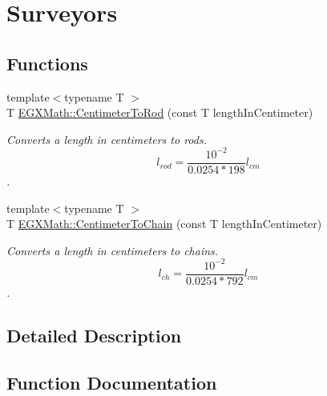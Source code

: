 \hypertarget{group___e_g_x_math-_conversions-_length_conversions-_s_i-_centimeter-_surveyors}{}\section{Surveyors}
\label{group___e_g_x_math-_conversions-_length_conversions-_s_i-_centimeter-_surveyors}
\subsection*{Functions}
\begin{DoxyCompactItemize}
\item 
{\footnotesize template$<$typename T $>$ }\\T \mbox{\hyperlink{group___e_g_x_math-_conversions-_length_conversions-_s_i-_centimeter-_surveyors_gae8148fd547fed6b4308b4ba4b54c2273}{E\+G\+X\+Math\+::\+Centimeter\+To\+Rod}} (const T length\+In\+Centimeter)
\begin{DoxyCompactList}\small\item\em Converts a length in centimeters to rods. \[ l_{rod}= \frac{10^{-2}}{0.0254 * 198} l_{cm} \]. \end{DoxyCompactList}\item 
{\footnotesize template$<$typename T $>$ }\\T \mbox{\hyperlink{group___e_g_x_math-_conversions-_length_conversions-_s_i-_centimeter-_surveyors_gaec0a2935a1378c75c03f93d48794374a}{E\+G\+X\+Math\+::\+Centimeter\+To\+Chain}} (const T length\+In\+Centimeter)
\begin{DoxyCompactList}\small\item\em Converts a length in centimeters to chains. \[ l_{ch}= \frac{10^{-2}}{0.0254 * 792} l_{cm} \]. \end{DoxyCompactList}\end{DoxyCompactItemize}


\subsection{Detailed Description}


\subsection{Function Documentation}
\mbox{\label{group___e_g_x_math-_conversions-_length_conversions-_s_i-_centimeter-_surveyors_gaec0a2935a1378c75c03f93d48794374a}} 
